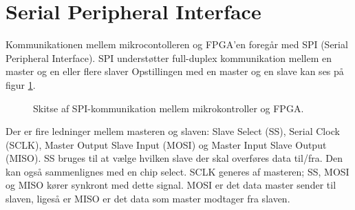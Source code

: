 \section{Serial Peripheral Interface}
Kommunikationen mellem mikrocontolleren og FPGA’en foregår med SPI (Serial Peripheral Interface). SPI understøtter full-duplex kommunikation mellem en master og en eller flere slaver
Opstillingen med en master og en slave kan ses på figur \ref{fig:SPImasterslave}.
\begin{figure}[!th]
\centering
\begin{tikzpicture}[scale=0.8]

\end{tikzpicture}
\caption[SPI protokol]{Skitse af SPI-kommunikation mellem mikrokontroller og FPGA.}
\label{fig:SPImasterslave}
\end{figure}

Der er fire ledninger mellem masteren og slaven: Slave Select (SS), Serial Clock (SCLK), Master Output Slave Input (MOSI) og Master Input Slave Output (MISO). SS bruges til at vælge hvilken slave der skal overføres data til/fra. Den kan også sammenlignes med en chip select. SCLK generes af masteren; SS, MOSI og MISO kører synkront med dette signal. MOSI er det data master sender til slaven, ligeså er MISO er det data som master modtager fra slaven.
